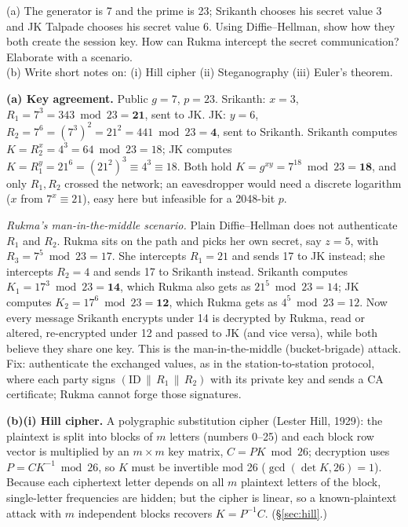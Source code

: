 \begin{keybox}[title={Q6 (6 + 6 marks)}]
(a) The generator is 7 and the prime is 23; Srikanth chooses his secret value 3 and JK Talpade chooses his secret value 6. Using Diffie--Hellman, show how they both create the session key. How can Rukma intercept the secret communication? Elaborate with a scenario.\\
(b) Write short notes on: (i) Hill cipher (ii) Steganography (iii) Euler's theorem.
\end{keybox}
\textbf{(a) Key agreement.} Public $g = 7$, $p = 23$. Srikanth: $x = 3$, $R_1 = 7^3 = 343 \bmod 23 = \mathbf{21}$, sent to JK. JK: $y = 6$, $R_2 = 7^6 = (7^3)^2 = 21^2 = 441 \bmod 23 = \mathbf 4$, sent to Srikanth. Srikanth computes $K = R_2^x = 4^3 = 64 \bmod 23 = 18$; JK computes $K = R_1^y = 21^6 = (21^2)^3 \equiv 4^3 \equiv 18$. Both hold $K = g^{xy} = 7^{18} \bmod 23 = \mathbf{18}$, and only $R_1, R_2$ crossed the network; an eavesdropper would need a discrete logarithm ($x$ from $7^x \equiv 21$), easy here but infeasible for a 2048-bit $p$.

\emph{Rukma's man-in-the-middle scenario.} Plain Diffie--Hellman does not authenticate $R_1$ and $R_2$. Rukma sits on the path and picks her own secret, say $z = 5$, with $R_3 = 7^5 \bmod 23 = 17$. She intercepts $R_1 = 21$ and sends 17 to JK instead; she intercepts $R_2 = 4$ and sends 17 to Srikanth instead. Srikanth computes $K_1 = 17^3 \bmod 23 = \mathbf{14}$, which Rukma also gets as $21^5 \bmod 23 = 14$; JK computes $K_2 = 17^6 \bmod 23 = \mathbf{12}$, which Rukma gets as $4^5 \bmod 23 = 12$. Now every message Srikanth encrypts under 14 is decrypted by Rukma, read or altered, re-encrypted under 12 and passed to JK (and vice versa), while both believe they share one key. This is the man-in-the-middle (bucket-brigade) attack. Fix: authenticate the exchanged values, as in the station-to-station protocol, where each party signs $(\text{ID} \,\|\, R_1 \,\|\, R_2)$ with its private key and sends a CA certificate; Rukma cannot forge those signatures.

\textbf{(b)(i) Hill cipher.} A polygraphic substitution cipher (Lester Hill, 1929): the plaintext is split into blocks of $m$ letters (numbers 0--25) and each block row vector is multiplied by an $m \times m$ key matrix, $C = PK \bmod 26$; decryption uses $P = CK^{-1} \bmod 26$, so $K$ must be invertible mod 26 ($\gcd(\det K, 26) = 1$). Because each ciphertext letter depends on all $m$ plaintext letters of the block, single-letter frequencies are hidden; but the cipher is linear, so a known-plaintext attack with $m$ independent blocks recovers $K = P^{-1}C$. (\S\ref{sec:hill}.)

